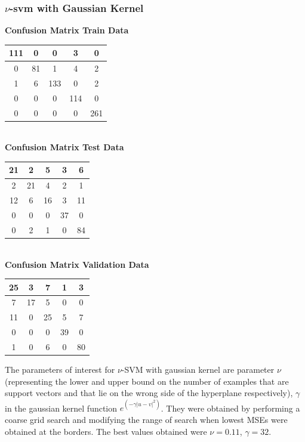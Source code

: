 \documentclass{article}
\begin{document}
\subsubsection{$\nu$-svm with Gaussian Kernel}
\begin{flushleft}
\textbf{Confusion Matrix Train Data\\[5pt]}
\begin{tabular}{|c|c|c|c|c|}
\hline
111 & 0 & 0 & 3 & 0 \\
\hline
0 & 81 & 1 & 4 & 2 \\
\hline
1 & 6 & 133 & 0 & 2\\
\hline
0 & 0 & 0 & 114 & 0\\
\hline
0 & 0 & 0 & 0 & 261 \\
\hline
\end{tabular}
\textbf{\\[10pt] Confusion Matrix Test Data \\[5pt]}
\begin{tabular}{|c|c|c|c|c|}
\hline
21 & 2 & 5 & 3 & 6\\
\hline
2 & 21 & 4 & 2 & 1 \\
\hline
12 & 6 & 16 & 3 & 11 \\
\hline
0 & 0 & 0 & 37 & 0 \\
\hline
0 & 2 & 1 & 0 & 84 \\
\hline
\end{tabular}
\textbf{\\[10pt] Confusion Matrix Validation Data \\[5pt]}
\begin{tabular}{|c|c|c|c|c|}
\hline
25 & 3 & 7 & 1 & 3 \\
\hline
7 & 17 & 5 & 0 & 0 \\
\hline
11 & 0 & 25 & 5 & 7 \\
\hline
0 & 0 & 0 & 39 & 0 \\
\hline
1 & 0 & 6 & 0 & 80 \\
\hline
\end{tabular}
\end{flushleft}


The parameters of interest for $\nu$-SVM with gaussian kernel are parameter $\nu$(representing the lower and upper bound on the number of examples that are support vectors and that lie on the wrong side of the hyperplane respectively), $\gamma$ in the gaussian kernel function $e^{(-\gamma|u-v|^{2})}$. They were obtained by performing a coarse grid search and modifying the range of search when lowest MSEs were obtained at the borders.
The best values obtained were $\nu=0.11$, $\gamma=32$.
\end{document}
